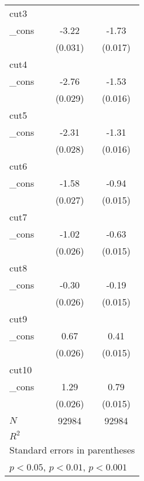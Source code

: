 {\begin{tabular}{l*{2}{c}}
\hline
cut3        &                     &                     \\
\_cons      &       -3.22\sym{***}&       -1.73\sym{***}\\
            &     (0.031)         &     (0.017)         \\
\hline
cut4        &                     &                     \\
\_cons      &       -2.76\sym{***}&       -1.53\sym{***}\\
            &     (0.029)         &     (0.016)         \\
\hline
cut5        &                     &                     \\
\_cons      &       -2.31\sym{***}&       -1.31\sym{***}\\
            &     (0.028)         &     (0.016)         \\
\hline
cut6        &                     &                     \\
\_cons      &       -1.58\sym{***}&       -0.94\sym{***}\\
            &     (0.027)         &     (0.015)         \\
\hline
cut7        &                     &                     \\
\_cons      &       -1.02\sym{***}&       -0.63\sym{***}\\
            &     (0.026)         &     (0.015)         \\
\hline
cut8        &                     &                     \\
\_cons      &       -0.30\sym{***}&       -0.19\sym{***}\\
            &     (0.026)         &     (0.015)         \\
\hline
cut9        &                     &                     \\
\_cons      &        0.67\sym{***}&        0.41\sym{***}\\
            &     (0.026)         &     (0.015)         \\
\hline
cut10       &                     &                     \\
\_cons      &        1.29\sym{***}&        0.79\sym{***}\\
            &     (0.026)         &     (0.015)         \\
\hline
\(N\)       &       92984         &       92984         \\
\(R^{2}\)   &                     &                     \\
\hline\hline
\multicolumn{3}{l}{\footnotesize Standard errors in parentheses}\\
\multicolumn{3}{l}{\footnotesize \sym{*} \(p<0.05\), \sym{**} \(p<0.01\), \sym{***} \(p<0.001\)}\\
\end{tabular}
}

